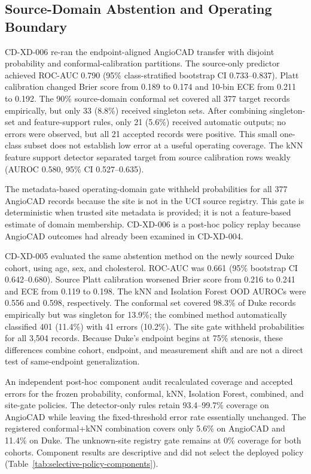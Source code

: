 \documentclass[12pt]{article}
\begin{document}
\subsection{Source-Domain Abstention and Operating Boundary}
CD-XD-006 re-ran the endpoint-aligned AngioCAD transfer with disjoint
probability and conformal-calibration partitions. The source-only predictor
achieved ROC-AUC 0.790 (95\% class-stratified bootstrap CI 0.733--0.837).
Platt calibration changed Brier score from 0.189 to 0.174 and 10-bin ECE from
0.211 to 0.192. The 90\% source-domain conformal set covered all 377 target
records empirically, but only 33 (8.8\%) received singleton sets. After
combining singleton-set and feature-support rules, only 21 (5.6\%) received
automatic outputs; no errors were observed, but all 21 accepted records were
positive. This small one-class subset does not establish low error at a useful
operating coverage. The kNN feature
support detector separated target from source calibration rows weakly
(AUROC 0.580, 95\% CI 0.527--0.635).

The metadata-based operating-domain gate withheld probabilities for all 377
AngioCAD records because the site is not in the UCI source registry. This gate
is deterministic when trusted site metadata is provided; it is not a
feature-based estimate of domain membership. CD-XD-006 is a post-hoc policy
replay because AngioCAD outcomes had already been examined in CD-XD-004.

CD-XD-005 evaluated the same abstention method on the newly sourced Duke
cohort, using age, sex, and cholesterol. ROC-AUC was 0.661 (95\% bootstrap CI
0.642--0.680). Source Platt calibration worsened Brier score from 0.216 to
0.241 and ECE from 0.119 to 0.198. The kNN and Isolation Forest OOD AUROCs
were 0.556 and 0.598, respectively. The conformal set covered 98.3\% of Duke
records empirically but was singleton for 13.9\%; the combined method
automatically classified 401 (11.4\%) with 41 errors (10.2\%). The site gate
withheld probabilities for all 3,504 records. Because Duke's endpoint begins
at 75\% stenosis, these differences combine cohort, endpoint, and measurement
shift and are not a direct test of same-endpoint generalization.

An independent post-hoc component audit recalculated coverage and accepted
errors for the frozen probability, conformal, kNN, Isolation Forest, combined,
and site-gate policies. The detector-only rules retain 93.4--99.7\% coverage
on AngioCAD while leaving the fixed-threshold error rate essentially
unchanged. The registered conformal+kNN combination covers only 5.6\% on
AngioCAD and 11.4\% on Duke. The unknown-site registry gate remains at 0\%
coverage for both cohorts. Component results are descriptive and did not
select the deployed policy (Table~\ref{tab:selective-policy-components}).
\end{document}
